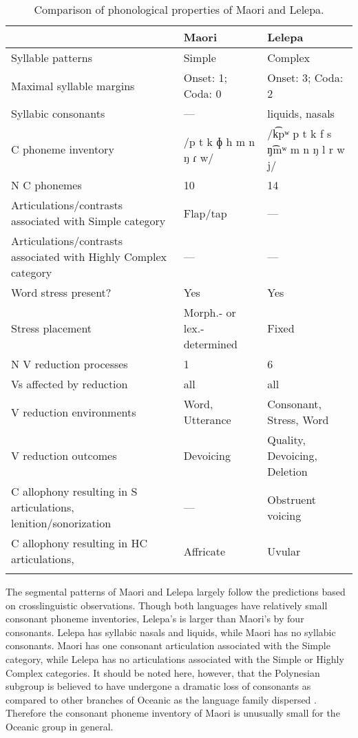 \begin{table}
\small
\begin{tabularx}{\textwidth}{QQQ}
\lsptoprule
 & {Maori} & {Lelepa}\\
 \midrule 
 {Syllable patterns} & Simple & Complex\\
\tablevspace
 {Maximal syllable margins} & Onset: 1; Coda: 0 & Onset: 3; Coda: 2\\
\tablevspace
 {Syllabic consonants} & — & liquids, nasals\\
\tablevspace
 {C phoneme inventory} & /p t k ɸ h m n ŋ ɾ w/ & /k͡pʷ p t k f s ŋ͡mʷ m n ŋ l r w j/\\
\tablevspace
 {N C phonemes} & 10 & 14\\
\tablevspace
 {Articulations/contrasts associated with {Simple}} {category} & {Flap/tap} & {—}\\
\tablevspace
 {Articulations/contrasts associated with {Highly Complex}} {category} & {—} & {—}\\
\tablevspace
 {Word stress present?} & {Yes} & {Yes}\\
\tablevspace
 {Stress placement} & {Morph.- or lex.-determined} & {Fixed}\\
\tablevspace
 {N V reduction processes} & {1} & {6}\\
\tablevspace
 {Vs affected by reduction}  & {all} & {all}\\
\tablevspace
 {V reduction environments} & {Word, Utterance} & {Consonant, Stress, Word}\\
\tablevspace
 {V reduction outcomes} & {Devoicing} & {Quality, Devoicing, Deletion}\\
\tablevspace
 {C allophony resulting in S articulations, lenition/sonorization} & {—} & { {Obstruent voicing}}\\
\tablevspace
{ {C allophony resulting in HC articulations,} } & { {Affricate}} & {Uvular}\\
\lspbottomrule
\end{tabularx}
\caption{\label{tab:8.7}Comparison of phonological properties of Maori and Lelepa.}
\end{table}

  The segmental patterns of Maori and Lelepa largely follow the predictions based on crosslinguistic observations. Though both languages have relatively small consonant phoneme inventories, Lelepa’s is larger than Maori’s by four consonants. Lelepa has syllabic nasals and liquids, while Maori has no syllabic consonants. Maori has one consonant articulation associated with the Simple category, while Lelepa has no articulations associated with the Simple or Highly Complex categories. It should be noted here, however, that the Polynesian subgroup is believed to have undergone a dramatic loss of consonants as compared to other branches of Oceanic as the language family dispersed \citep{Trudgill2004}. Therefore the consonant phoneme inventory of Maori is unusually small for the Oceanic group in general.

